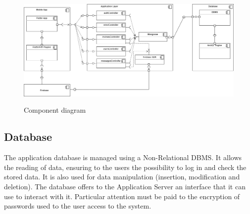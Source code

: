 \documentclass[../../dd.tex]{subfiles}
\begin{document}
    \begin{figure}[H]
        \centering
        \includegraphics[scale=0.35]{assets/component.png}\\[1.6 cm]
        \caption[Component diagram]{Component diagram}
    \end{figure}

    \subsection{Database}
    The application database is managed using a Non-Relational DBMS.
    It allows the reading of data, ensuring to the users the possibility to log in and check the stored data.
    It is also used for data manipulation (insertion, modification and deletion).
    The database offers to the Application Server an interface that it can use
    to interact with it.
    Particular attention must be paid to the encryption of passwords used to the user access to the system.
\end{document}
